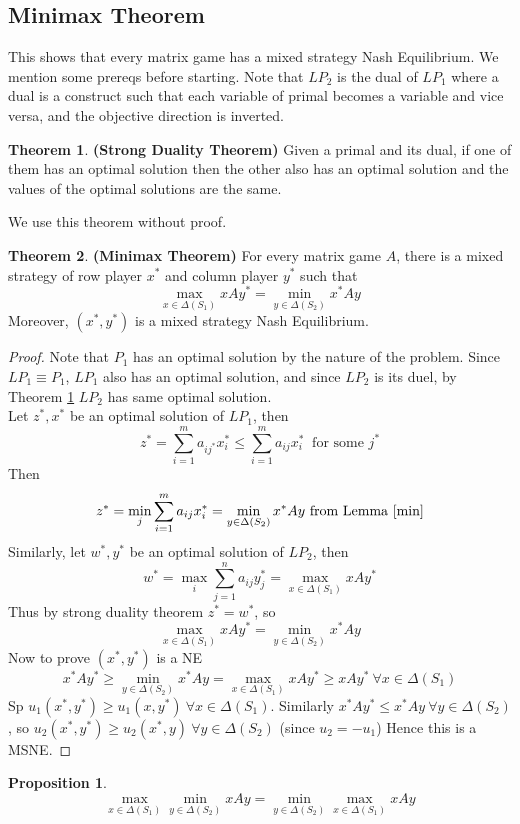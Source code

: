 \documentclass{article}
\theoremstyle{definition}
\newtheorem{theorem}{Theorem}[section]
\newtheorem{prop}{Proposition}[section]
\begin{document}
\subsection{Minimax Theorem}
This shows that every matrix game has a mixed strategy Nash Equilibrium. We mention some prereqs before starting. Note that $LP_2$ is the dual of $LP_1$ where a dual is a construct such that each variable of primal becomes a variable and vice versa, and the objective direction is inverted.\\
\begin{theorem}
\label{strong duality}
\textbf{(Strong Duality Theorem)} Given a primal and its dual, if one of them has an optimal solution then the other also has an optimal solution and the values of the optimal solutions are the same.
\end{theorem}
We use this theorem without proof.
\begin{theorem}
\label{minimax theorem}
\textbf{(Minimax Theorem)} For every matrix game $A$, there is a mixed strategy of row player $x^*$ and column player $y^*$ such that $$\max_{x\in \Delta(S_1)} xAy^* = \min_{y\in \Delta(S_2)} x^*Ay$$ Moreover, $(x^*,y^*)$ is a mixed strategy Nash Equilibrium.
\end{theorem}
\begin{proof}
Note that $P_1$ has an optimal solution by the nature of the problem. Since $LP_1 \equiv P_1$, $LP_1$ also has an optimal solution, and since $LP_2$ is its duel, by Theorem \ref{strong duality} $LP_2$ has same optimal solution.\\
Let $z^*,x^*$ be an optimal solution of $LP_1$, then $$z^* = \sum_{i=1}^m a_{ij^*}x_i^* \leq \sum_{i=1}^m a_{ij}x_i^* ~\text{ for some } j^*$$
Then $$z^* = \min_j \sum_{i=1}^m a_{ij}x_i^* = \min_{y\in \Delta(S_2)} x^*Ay \text{ from Lemma \ref{min}}$$ Similarly, let $w^*, y^*$ be an optimal solution of $LP_2$, then $$w^* = \max_i \sum_{j=1}^n a_{ij}y_j^* = \max_{x\in \Delta(S_1)}xAy^*$$ Thus by strong duality theorem $z^* = w^*$, so $$\max_{x\in \Delta(S_1)} xAy^* = \min_{y\in \Delta(S_2)} x^*Ay$$
Now to prove $(x^*,y^*)$ is a NE $$x^*Ay^* \geq \min_{y\in \Delta(S_2)} x^*Ay = \max_{x\in \Delta(S_1)} xAy^* \geq xAy^* ~\forall x\in \Delta(S_1)$$ Sp $u_1(x^*,y^*)\geq u_1(x,y^*)~\forall x\in \Delta(S_1)$. Similarly $x^*Ay^*\leq x^*Ay~\forall y\in \Delta(S_2)$, so $u_2(x^*,y^*)\geq u_2(x^*,y)~\forall y\in \Delta(S_2)$ (since $u_2 = -u_1$) Hence this is a MSNE. 
\end{proof}
\begin{prop}
\label{Equality in maxmin}
$$\max_{x\in \Delta(S_1)}\min_{y\in \Delta(S_2)} xAy = \min_{y\in \Delta(S_2)}\max_{x\in \Delta(S_1)} xAy$$
\end{prop}
\end{document}
